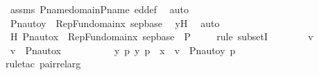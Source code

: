 \begin{isabellebody}
\ assms{}\ P{\isacharunderscore}{\kern0pt}name{\isacharunderscore}{\kern0pt}domain{\isacharunderscore}{\kern0pt}P{\isacharunderscore}{\kern0pt}name\ ed{\isacharunderscore}{\kern0pt}def\ \isamarkupfalse%
\ auto\isanewline
\ \ \ \ \ \ \isamarkupfalse%
\ \isamarkupfalse%
\ {\isachardoublequoteopen}Pn{\isacharunderscore}{\kern0pt}auto{\isacharparenleft}{\kern0pt}{\isasympi}{\isacharparenright}{\kern0pt}{\isacharbackquote}{\kern0pt}y\ {\isasymin}\ {\isasymUnion}RepFun{\isacharparenleft}{\kern0pt}domain{\isacharparenleft}{\kern0pt}x{}{\isacharparenright}{\kern0pt}{\isacharcomma}{\kern0pt}\ sep{\isacharunderscore}{\kern0pt}base{\isacharparenright}{\kern0pt}{\isachardoublequoteclose}\ \isamarkupfalse%
\ y{}H\ \isamarkupfalse%
\ auto\ \isanewline
\ \ \ \ \isamarkupfalse%
\isanewline
\isanewline
\ \ \ \ \isamarkupfalse%
\ H{\isacharcolon}{\kern0pt}\ {\isachardoublequoteopen}Pn{\isacharunderscore}{\kern0pt}auto{\isacharparenleft}{\kern0pt}{\isasympi}{\isacharparenright}{\kern0pt}{\isacharbackquote}{\kern0pt}x\ {\isasymsubseteq}\ {\isacharparenleft}{\kern0pt}{\isasymUnion}RepFun{\isacharparenleft}{\kern0pt}domain{\isacharparenleft}{\kern0pt}x{}{\isacharparenright}{\kern0pt}{\isacharcomma}{\kern0pt}\ sep{\isacharunderscore}{\kern0pt}base{\isacharparenright}{\kern0pt}\ {\isasymtimes}\ P{\isacharparenright}{\kern0pt}{\isachardoublequoteclose}\isanewline
\ \ \ \ \isamarkupfalse%
{\isacharparenleft}{\kern0pt}rule\ subsetI{\isacharparenright}{\kern0pt}\isanewline
\ \ \ \ \ \ \isamarkupfalse%
\ v\ \isamarkupfalse%
\ {\isachardoublequoteopen}v\ {\isasymin}\ Pn{\isacharunderscore}{\kern0pt}auto{\isacharparenleft}{\kern0pt}{\isasympi}{\isacharparenright}{\kern0pt}{\isacharbackquote}{\kern0pt}x{\isachardoublequoteclose}\ \isanewline
\ \ \ \ \ \ \isamarkupfalse%
\ \isamarkupfalse%
\ {\isachardoublequoteopen}{\isasymexists}y\ p{\isachardot}{\kern0pt}\ {\isacharless}{\kern0pt}y{\isacharcomma}{\kern0pt}\ p{\isachargreater}{\kern0pt}\ {\isasymin}\ x\ {\isasymand}\ v\ {\isacharequal}{\kern0pt}\ {\isacharless}{\kern0pt}Pn{\isacharunderscore}{\kern0pt}auto{\isacharparenleft}{\kern0pt}{\isasympi}{\isacharparenright}{\kern0pt}{\isacharbackquote}{\kern0pt}y{\isacharcomma}{\kern0pt}\ {\isasympi}{\isacharbackquote}{\kern0pt}p{\isachargreater}{\kern0pt}{\isachardoublequoteclose}\ \isanewline
\ \ \ \ \ \ \ \ \isamarkupfalse%
{\isacharparenleft}{\kern0pt}rule{\isacharunderscore}{\kern0pt}tac\ pair{\isacharunderscore}{\kern0pt}rel{\isacharunderscore}{\kern0pt}arg{\isacharparenright}{\kern0pt}\isanewline

\end{isabellebody}
